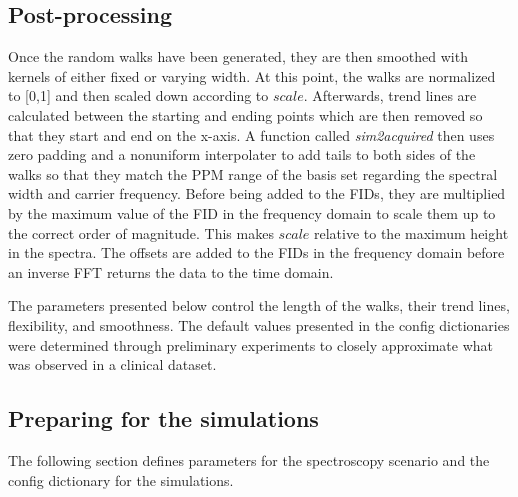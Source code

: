 \documentclass[AMA,LATO1COL]{WileyNJD-v2}
\begin{document}
\subsection{Post-processing}\label{post-processing}
Once the random walks have been generated, they are then smoothed with kernels of either fixed or varying width. At this point, the walks are normalized to [0,1] and then scaled down according to \(scale\). Afterwards, trend lines are calculated between the starting and ending points which are then removed so that they start and end on the x-axis. A function called \emph{sim2acquired} then uses zero padding and a nonuniform interpolater to add tails to both sides of the walks so that they match the PPM range of the basis set regarding the spectral width and carrier frequency. Before being added to the FIDs, they are multiplied by the maximum value of the FID in the frequency domain to scale them up to the correct order of magnitude. This makes \(scale\) relative to the maximum height in the spectra. The offsets are added to the FIDs in the frequency domain before an inverse FFT returns the data to the time domain.

The parameters presented below control the length of the walks, their trend lines, flexibility, and smoothness. The default values presented in the config dictionaries were determined through preliminary experiments to closely approximate what was observed in a clinical dataset.

\subsection{Preparing for the simulations}\label{preparing-for-the-simulations}
The following section defines parameters for the spectroscopy scenario and the config dictionary for the simulations. \\
\end{document}
